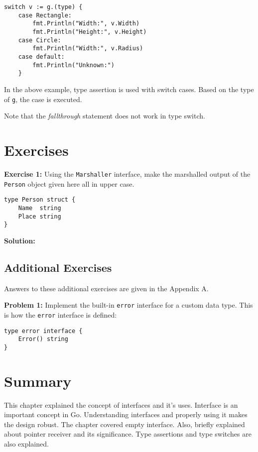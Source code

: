 \begin{lstlisting}[numbers=none]
    switch v := g.(type) {
    case Rectangle:
        fmt.Println("Width:", v.Width)
        fmt.Println("Height:", v.Height)
    case Circle:
        fmt.Println("Width:", v.Radius)
    case default:
        fmt.Println("Unknown:")
    }
\end{lstlisting}

In the above example, type assertion is used with switch cases.  Based
on the type of \texttt{g}, the case is executed.

Note that the \textit{fallthrough} statement does not work in type
switch.

\section{Exercises}

\textbf{Exercise 1:} Using the \texttt{Marshaller} interface, make the marshalled output of the
\texttt{Person} object given here all in upper case.

\begin{lstlisting}[numbers=none]
type Person struct {
    Name  string
    Place string
}
\end{lstlisting}

\textbf{Solution:}



\subsection{Additional Exercises}

Answers to these additional exercises are given in the Appendix A.

\textbf{Problem 1:} Implement the built-in \texttt{error} interface for a custom data type.
This is how the \texttt{error} interface is defined:

\begin{lstlisting}[numbers=none]
type error interface {
    Error() string
}
\end{lstlisting}


\section*{Summary}

This chapter explained the concept of interfaces and it's uses.
Interface is an important concept in Go.  Understanding interfaces and
properly using it makes the design robust.  The chapter covered empty
interface.  Also, briefly explained about pointer receiver and its
significance.  Type assertions and type switches are also explained.
